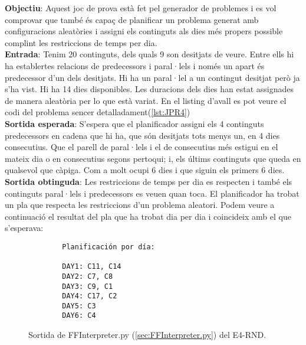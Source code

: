 \documentclass[a4paper]{article}
\begin{document}
	\noindent \textbf{Objectiu}: Aquest joc de prova està fet pel generador de problemes i es vol comprovar que també és capaç de planificar un problema generat amb configuracions aleatòries i assigni els continguts als dies més propers possible complint les restriccions de temps per dia.\\
	
	\noindent \textbf{Entrada}: Tenim 20 continguts, dels quals 9 son desitjats de veure. Entre ells hi ha establertes relacions de predecessors i paral·lels i només un apart és predecessor d'un dels desitjats. Hi ha un paral·lel a un contingut desitjat però ja s'ha vist. Hi ha 14 dies disponibles. Les duracions dels dies han estat assignades de manera aleatòria per lo que està variat. En el listing d'avall es pot veure el codi del problema sencer detalladament(\ref{lst:JPR4})\\
	
	\noindent \textbf{Sortida esperada}: S'espera que el planificador assigni els 4 continguts predecessors en cadena que hi ha, que són desitjats tots menys un, en 4 dies consecutius. Que el parell de paral·lels i el de consecutius més estigui en el mateix dia o en consecutius segons pertoqui; i, els últims continguts que queda en qualsevol que càpiga. Com a molt ocupi 6 dies i que siguin els primers 6 dies.\\
	
	\noindent \textbf{Sortida obtinguda}: Les restriccions de temps per dia es respecten i també els continguts paral·lels i predecessors es veuen quan toca. El planificador ha trobat un pla que respecta les restriccions d'un problema aleatori.  Podem veure a continuació el resultat del pla que ha trobat dia per dia i coincideix amb el que s'esperava:\\
	
	\begin{figure}[H]
		\centering
		\begin{verbatim}
		Planificación por día:
		
		DAY1: C11, C14
		DAY2: C7, C8
		DAY3: C9, C1
		DAY4: C17, C2
		DAY5: C3
		DAY6: C4
		\end{verbatim}
		\caption{Sortida de FFInterpreter.py (\ref{sec:FFInterpreter.py}) del E4-RND.}
	\end{figure}
	
\end{document}
